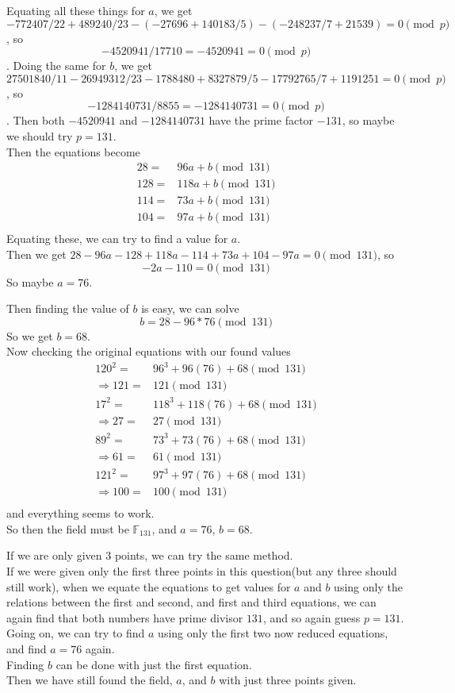 \documentclass{assignment}
\begin{document}
\begin{problemlist}
\begin{problem}
  Equating all these things for $a$, we get\\
  $-772407/22+489240/23-(-27696+140183/5)-(-248237/7+21539)=0 \pmod{p}$, so
  \[
  -4520941/17710=-4520941=0 \pmod{p}
  \].
  Doing the same for $b$, we get\\
  $27501840/11-26949312/23-1788480+8327879/5-17792765/7+1191251=0 \pmod{p}$, so
  \[
  -1284140731/8855=-1284140731=0 \pmod{p}
  \].
  Then both $-4520941$ and $-1284140731$ have the prime factor $-131$, so maybe we should try $p=131$.\\

  Then the equations become
  \begin{align*}
    28=&96a+b\pmod{131}\\
    128=&118a+b\pmod{131}\\
    114=&73a+b\pmod{131}\\
    104=&97a+b\pmod{131}\\
  \end{align*}
  Equating these, we can try to find a value for $a$.\\
  Then we get $28-96a-128+118a-114+73a+104-97a=0 \pmod{131}$, so
  \[
  -2a -110 =0 \pmod{131}
  \]
  So maybe $a=76$.

  Then finding the value of $b$ is easy, we can solve
  \[
  b=28-96*76 \pmod{131}
  \]
  So we get $b=68$.\\

  Now checking the original equations with our found values
  \begin{align*}
    120^2=&96^3+96(76)+68\pmod{131}\\
    \Rightarrow121=&121\pmod{131}\\
    17^2=&118^3+118(76)+68\pmod{131}\\
    \Rightarrow27=&27\pmod{131}\\
    89^2=&73^3+73(76)+68\pmod{131}\\
    \Rightarrow61=&61\pmod{131}\\
    121^2=&97^3+97(76)+68\pmod{131}\\
    \Rightarrow100=&100\pmod{131}\\
  \end{align*}
  and everything seems to work.\\
  So then the field must be $\mathbb{F}_{131}$, and $a=76$, $b=68$.

  If we are only given $3$ points, we can try the same method.\\
  If we were given only the first three points in this question(but any three should still work), when we equate the equations to get values for $a$ and $b$ using only the relations between the first and second, and first and third equations, we can again find that both numbers have prime divisor $131$, and so again guess $p=131$.\\
  Going on, we can try to find $a$ using only the first two now reduced equations, and find $a=76$ again.\\
  Finding $b$ can be done with just the first equation.\\
  Then we have still found the field, $a$, and $b$ with just three points given.
\end{problem} 

\end{problemlist}
\end{document}
